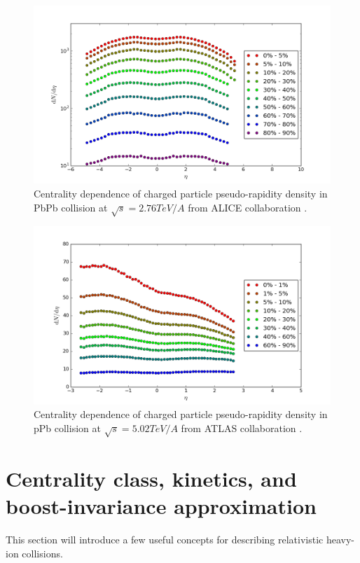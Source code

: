 \documentclass[aps,prl,twocolumn,groupedaddress]{revtex4-1}
\begin{document}
\begin{figure}
\begin{center}
\includegraphics[width=\columnwidth]{pics/dNdy-PbPb.png}
\caption{Centrality dependence of charged particle pseudo-rapidity density in PbPb collision at $\sqrt{s} = 2.76 TeV/A$ from ALICE collaboration \citep{ALICE:2015kda}.}
\label{AA-dNdy}
\end{center}
\end{figure}

\begin{figure}
\begin{center}
\includegraphics[width=\columnwidth]{pics/dNdy-pPb.png}
\caption{Centrality dependence of charged particle pseudo-rapidity density in pPb collision at $\sqrt{s} = 5.02 TeV/A$ from ATLAS collaboration \citep{Aad:2015zza}.}
\label{pA-dNdy}
\end{center}
\end{figure}

\section{Centrality class, kinetics, and boost-invariance approximation}
	This section will introduce a few useful concepts for describing relativistic heavy-ion collisions.
	
\end{document}
